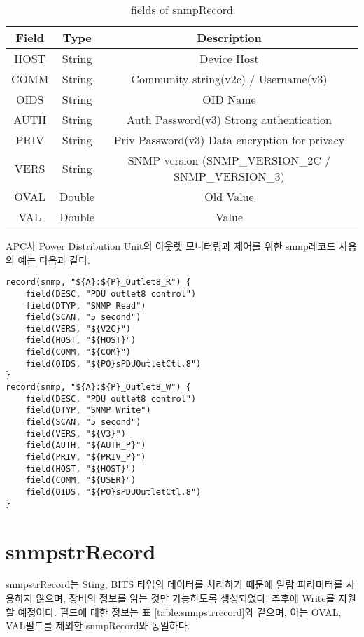 \documentclass[11pt
  , a4paper
  , article
  , oneside
]{memoir}
\begin{document}
\begin{table}[!h]
\begin{center}
\begin{tabular}{c|c|c}\hline
Field & Type & Description \\ \hline
HOST & String & Device Host \\ \hline
COMM & String & Community string(v2c) / Username(v3) \\ \hline
OIDS & String & OID Name \\ \hline
AUTH & String & Auth Password(v3) Strong authentication \\ \hline
PRIV & String & Priv Password(v3) Data encryption for privacy\\ \hline
VERS & String & SNMP version (SNMP\_VERSION\_2C / SNMP\_VERSION\_3) \\ \hline
OVAL & Double & Old Value \\ \hline
VAL & Double & Value \\ \hline
\end{tabular}
\caption{fields of snmpRecord}
\label{table:snmprecord} 
\end{center}
\end{table} 

APC사 Power Distribution Unit의 아웃렛 모니터링과 제어를 위한 snmp레코드 사용의 예는 다음과 같다.

{\scriptsize
\begin{verbatim}
record(snmp, "${A}:${P}_Outlet8_R") {
    field(DESC, "PDU outlet8 control")
    field(DTYP, "SNMP Read")
    field(SCAN, "5 second")
    field(VERS, "${V2C}")
    field(HOST, "${HOST}")
    field(COMM, "${COM}")
    field(OIDS, "${PO}sPDUOutletCtl.8")
}
record(snmp, "${A}:${P}_Outlet8_W") {
    field(DESC, "PDU outlet8 control")
    field(DTYP, "SNMP Write")
    field(SCAN, "5 second")
    field(VERS, "${V3}")
    field(AUTH, "${AUTH_P}")
    field(PRIV, "${PRIV_P}")
    field(HOST, "${HOST}")
    field(COMM, "${USER}")
    field(OIDS, "${PO}sPDUOutletCtl.8")
}
\end{verbatim}
}

\section{snmpstrRecord}
snmpstrRecord는 Sting, BITS 타입의 데이터를 처리하기 때문에 알람 파라미터를 사용하지 않으며, 장비의 정보를 읽는 것만 가능하도록 생성되었다. 추후에 Write를 지원할 예정이다. 필드에 대한 정보는 표 \ref{table:snmpstrrecord}와 같으며, 이는 OVAL, VAL필드를 제외한 snmpRecord와 동일하다. 
\clearpage
\end{document}
